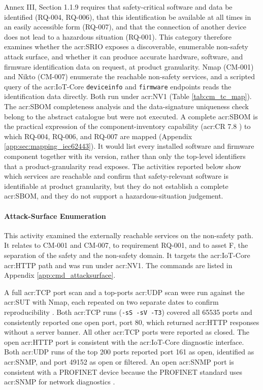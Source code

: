 Annex III, Section 1.1.9 requires that safety-critical software and data be identified (RQ-004, RQ-006), that this identification be available at all times in an easily accessible form (RQ-007), and that the connection of another device does not lead to a hazardous situation (RQ-001). This category therefore examines whether the \gls{acr:SRIO} exposes a discoverable, enumerable non-safety attack surface, and whether it can produce accurate hardware, software, and firmware identification data on request, at product granularity. Nmap (CM-001) and Nikto (CM-007) enumerate the reachable non-safety services, and a scripted query of the \gls{acr:IoT}-Core \texttt{deviceinfo} and \texttt{firmware} endpoints reads the identification data directly. Both run under \gls{acr:NV1} (Table \ref{tab:cm_tc_map}). The \gls{acr:SBOM} completeness analysis and the data-signature uniqueness check belong to the abstract catalogue but were not executed. A complete \gls{acr:SBOM} is the practical expression of the component-inventory capability (\gls{acr:CR} 7.8 \cite[pp. 68]{IEC62443-4-2}) to which RQ-004, RQ-006, and RQ-007 are mapped (Appendix \ref{app:sec:mapping_iec62443}). It would list every installed software and firmware component together with its version, rather than only the top-level identifiers that a product-granularity read exposes. The activities reported below show which services are reachable and confirm that safety-relevant software is identifiable at product granularity, but they do not establish a complete \gls{acr:SBOM}, and they do not support a hazardous-situation judgement.

\paragraph{Attack-Surface Enumeration}
\label{subsec:res_attack_surface}

This activity examined the externally reachable services on the non-safety path. It relates to CM-001 and CM-007, to requirement RQ-001, and to asset F, the separation of the safety and the non-safety domain. It targets the \gls{acr:IoT}-Core \gls{acr:HTTP} path and was run under \gls{acr:NV1}. The commands are listed in Appendix \ref{app:cmd_attacksurface}.

A full \gls{acr:TCP} port scan and a top-ports \gls{acr:UDP} scan were run against the \gls{acr:SUT} with Nmap, each repeated on two separate dates to confirm reproducibility \cite{nmap_usage}. Both \gls{acr:TCP} runs (\texttt{-sS -sV -T3}) covered all 65535 ports and consistently reported one open port, port 80, which returned \gls{acr:HTTP} responses without a server banner. All other \gls{acr:TCP} ports were reported as closed. The open \gls{acr:HTTP} port is consistent with the \gls{acr:IoT}-Core diagnostic interface. Both \gls{acr:UDP} runs of the top 200 ports reported port 161 as open, identified as \gls{acr:SNMP}, and port 49152 as open or filtered. An open \gls{acr:SNMP} port is consistent with a PROFINET device because the PROFINET standard uses \gls{acr:SNMP} for network diagnostics \cite[p. 11]{pi_pn_in_pa_2024}. 


